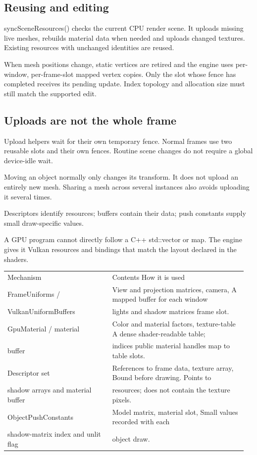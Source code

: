 \documentclass[11pt,a4paper]{article}
\begin{document}
\subsection*{Reusing and editing}
syncSceneResources() checks the current CPU render scene. It uploads missing live meshes, rebuilds material data when needed and uploads changed textures. Existing resources with unchanged identities are reused.

When mesh positions change, static vertices are retired and the engine uses per-window, per-frame-slot mapped vertex copies. Only the slot whose fence has completed receives its pending update. Index topology and allocation size must still match the supported edit.

\subsection*{Uploads are not the whole frame}
Upload helpers wait for their own temporary fence. Normal frames use two reusable slots and their own fences. Routine scene changes do not require a global device-idle wait.

Moving an object normally only changes its transform. It does not upload an entirely new mesh. Sharing a mesh across several instances also avoids uploading it several times.

\label{core-37}
Descriptors identify resources; buffers contain their data; push constants supply small draw-specific values.

A GPU program cannot directly follow a C++ std::vector or map. The engine gives it Vulkan resources and bindings that match the layout declared in the shaders.

{\small
\begin{longtable}{@{}p{0.42\linewidth}p{0.54\linewidth}@{}}
Mechanism & Contents                                    How it is used \\
FrameUniforms / & View and projection matrices, camera,       A mapped buffer for each window \\
VulkanUniformBuffers & lights and shadow matrices                  frame slot. \\
GpuMaterial / material & Color and material factors, texture-table   A dense shader-readable table; \\
buffer & indices                                     public material handles map to table slots. \\
Descriptor set & References to frame data, texture array,    Bound before drawing. Points to \\
shadow arrays and material buffer & resources; does not contain the texture pixels. \\
ObjectPushConstants & Model matrix, material slot,                Small values recorded with each \\
shadow-matrix index and unlit flag & object draw. \\
\end{longtable}
}
\end{document}
